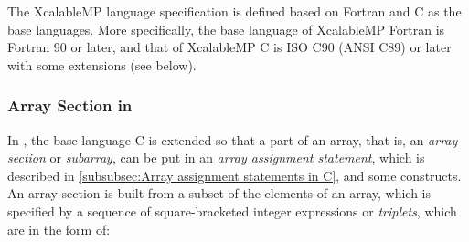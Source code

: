 The XcalableMP language specification is defined based on Fortran
and C as the base languages. More specifically, the base language of
XcalableMP Fortran is Fortran 90 or later, and that of XcalableMP C is
ISO C90 (ANSI C89) or later with some extensions (see below).

\subsubsection{Array Section in {\XMPC}}











In {\XMPC}, the base language C is extended so that a part of an array,
that is, an {\it array section} or {\it subarray}, can be put in an {\it
array assignment statement}, which is described in \ref{subsubsec:Array
assignment statements in C}, and some {\XMP} constructs.
%
An array section is built from a subset of the elements of an array,
which is specified by a sequence of square-bracketed integer expressions
or {\it triplets}, which are in the form of:

